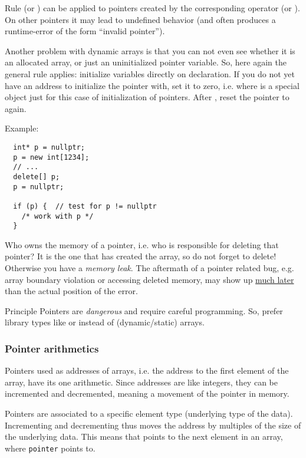 \begin{guideline}{Rule}
   (or ) can be applied to pointers created by the corresponding operator  (or ). On other pointers
  it may lead to undefined behavior (and often produces a runtime-error of the form ``invalid pointer'').
\end{guideline}

Another problem with dynamic arrays is that you can not even see whether it is an allocated array, or just an uninitialized pointer variable. So,
here again the general rule applies: initialize variables directly on declaration. If you do not yet have an address to initialize the pointer with,
set it to zero, i.e.
%
%
where  is a special object just for this case of initialization of pointers. After , reset the pointer to  again.

Example:
\begin{verbatim}
  int* p = nullptr;
  p = new int[1234];
  // ...
  delete[] p;
  p = nullptr;

  if (p) {  // test for p != nullptr
    /* work with p */
  }
\end{verbatim}

Who owns the memory of a pointer, i.e. who is responsible for deleting that pointer? It is the one that has created the array, so do not forget to delete!
Otherwise you have a \emph{memory leak}. The aftermath of a pointer related bug, e.g. array boundary violation or accessing deleted memory, may show up \underline{much later} than the actual position of the error.

\begin{guideline}{Principle}
  Pointers are \emph{dangerous} and require careful programming. So, prefer library types like  or  instead of
  (dynamic/static) arrays.
\end{guideline}


\subsubsection{Pointer arithmetics}
Pointers used as addresses of arrays, i.e. the address to the first element of the array, have its one arithmetic. Since addresses are like integers,
they can be incremented and decremented, meaning a movement of the pointer in memory.

Pointers are associated to a specific element type (underlying type of the data). Incrementing and decrementing thus moves the address by multiples of
the size of the underlying data. This means that  points to the next element in an array, where \texttt{pointer} points to.

